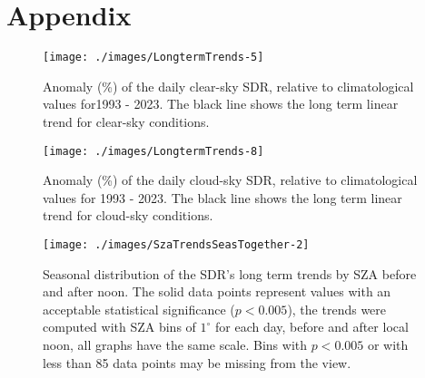 \documentclass[An awesome
journal,,,moreauthors,pdftex]{Definitions/mdpi}
\begin{document}
\hypertarget{appendix}{%
\section*{Appendix}\label{appendix}}

\begin{figure}[h!]

{\centering \texttt{[image: ./images/LongtermTrends-5]} 

}

\caption{Anomaly (\%) of the daily clear-sky SDR, relative to climatological values for1993 - 2023. The black line shows the long term linear trend for clear-sky conditions.}\label{fig:trendCLEAR}
\end{figure}

\begin{figure}[h!]

{\centering \texttt{[image: ./images/LongtermTrends-8]} 

}

\caption{Anomaly (\%) of the daily cloud-sky SDR, relative to climatological values for 1993 - 2023. The black line shows the long term linear trend for cloud-sky conditions.}\label{fig:trendCLOUD}
\end{figure}

\begin{figure}[h!]

{\centering \texttt{[image: ./images/SzaTrendsSeasTogether-2]} 

}

\caption{Seasonal distribution of the SDR's long term trends by SZA before and after noon. The solid data points represent values with an acceptable statistical significance ($p<0.005$), the trends were computed with SZA bins of $1^\circ$ for each day, before and after local noon, all graphs have the same scale. Bins with $p<0.005$ or with less than 85 data points may be missing from the view.}\label{fig:SZAtrendSeason}
\end{figure}


\vspace{6pt}


\end{document}
